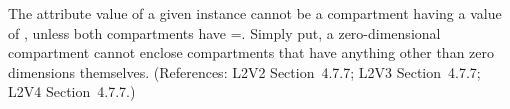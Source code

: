 The  attribute value of a given \Compartment
instance cannot be a compartment having a  value of
, unless both compartments have =.
Simply put, a zero-dimensional compartment cannot enclose compartments that
have anything other than zero dimensions themselves.  (References: L2V2
Section~4.7.7; L2V3 Section~4.7.7; L2V4 Section~4.7.7.)
